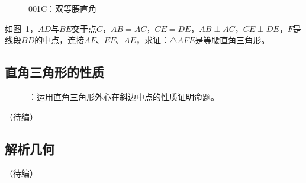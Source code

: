 

\begin{figure}[htbp]
  \centering
  \caption{001C：双等腰直角} \label{fig:001C}
\end{figure}

如图~\ref{fig:001C}，$AD$与$BE$交于点$C$，$AB = AC$，$CE = DE$，$AB \perp AC$，$CE \perp DE$，$F$是线段$BD$的中点，连接$AF$、$EF$、$AE$，求证：$\triangle AFE$是等腰直角三角形。

\subsection{直角三角形的性质} \label{subsec:001C-isrtri}

\begin{figure}[htbp]
  \centering
  \caption{：运用直角三角形外心在斜边中点的性质证明命题。}
  \label{fig:001C-isrtri}
\end{figure}

（待编）

\subsection{解析几何}

（待编）

